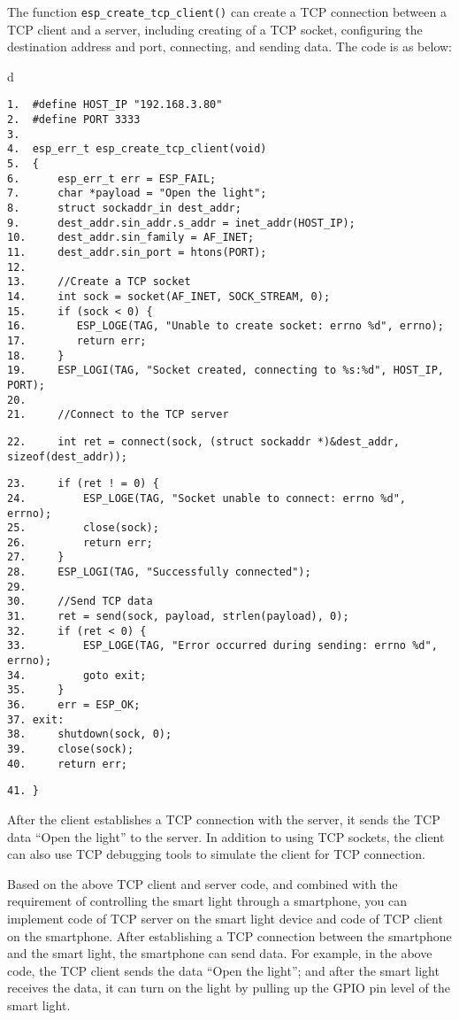 \documentclass[a4paper,12pt]{book}
\begin{document}
The function \verb|esp_create_tcp_client()| can create a TCP connection between a TCP client and a server, including creating of a TCP socket, configuring the destination address and port, connecting, and sending data. The code is as below:

\begin{codebloc}
\begin{tabular}{d}
\vspace{2pt}
\begin{verbatim}
1.  #define HOST_IP "192.168.3.80"
2.  #define PORT 3333
3.	
4.  esp_err_t esp_create_tcp_client(void)
5.  {
6.      esp_err_t err = ESP_FAIL;
7.      char *payload = "Open the light";
8.      struct sockaddr_in dest_addr;
9.      dest_addr.sin_addr.s_addr = inet_addr(HOST_IP);
10.     dest_addr.sin_family = AF_INET;
11.     dest_addr.sin_port = htons(PORT);
12.	
13.     //Create a TCP socket
14.     int sock = socket(AF_INET, SOCK_STREAM, 0);
15.     if (sock < 0) {
16.        ESP_LOGE(TAG, "Unable to create socket: errno %d", errno);
17.        return err;
18.     }
19.     ESP_LOGI(TAG, "Socket created, connecting to %s:%d", HOST_IP, PORT);
20.	
21.     //Connect to the TCP server
\end{verbatim}
\verb|22.     |\fontsize{9.5pt}{10pt}\selectfont\verb|int ret = connect(sock, (struct sockaddr *)&dest_addr, sizeof(dest_addr));|
\footnotesize
\begin{verbatim}
23.     if (ret ! = 0) {
24.         ESP_LOGE(TAG, "Socket unable to connect: errno %d", errno);
25.         close(sock);
26.         return err;
27.     }
28.     ESP_LOGI(TAG, "Successfully connected");
29.	
30.     //Send TCP data
31.     ret = send(sock, payload, strlen(payload), 0);
32.     if (ret < 0) {
33.         ESP_LOGE(TAG, "Error occurred during sending: errno %d", errno);
34.         goto exit;
35.     }
36.     err = ESP_OK;
37. exit:
38.     shutdown(sock, 0);
39.     close(sock);
40.     return err;
\end{verbatim}
\verb|41. }|
\end{tabular}
\end{codebloc}

After the client establishes a TCP connection with the server, it sends the TCP data “Open the light” to the server. In addition to using TCP sockets, the client can also use TCP debugging tools to simulate the client for TCP connection.

Based on the above TCP client and server code, and combined with the requirement of controlling the smart light through a smartphone, you can implement code of TCP server on the smart light device and code of TCP client on the smartphone. After establishing a TCP connection between the smartphone and the smart light, the smartphone can send data. For example, in the above code, the TCP client sends the data “Open the light”; and after the smart light receives the data, it can turn on the light by pulling up the GPIO pin level of the smart light.
\end{document}
